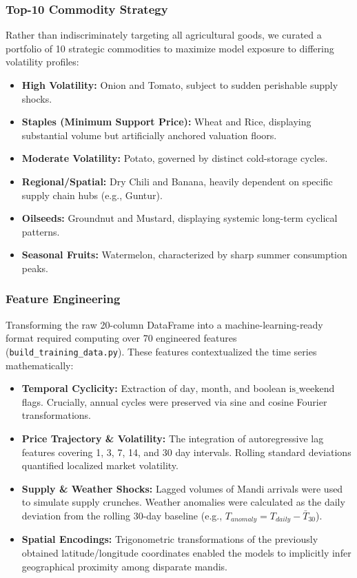 \documentclass[conference]{IEEEtran}
\begin{document}
\subsubsection{Top-10 Commodity Strategy}
Rather than indiscriminately targeting all agricultural goods, we curated a portfolio of 10 strategic commodities to maximize model exposure to differing volatility profiles:
\begin{itemize}
    \item \textbf{High Volatility:} Onion and Tomato, subject to sudden perishable supply shocks.
    \item \textbf{Staples (Minimum Support Price):} Wheat and Rice, displaying substantial volume but artificially anchored valuation floors.
    \item \textbf{Moderate Volatility:} Potato, governed by distinct cold-storage cycles.
    \item \textbf{Regional/Spatial:} Dry Chili and Banana, heavily dependent on specific supply chain hubs (e.g., Guntur).
    \item \textbf{Oilseeds:} Groundnut and Mustard, displaying systemic long-term cyclical patterns.
    \item \textbf{Seasonal Fruits:} Watermelon, characterized by sharp summer consumption peaks.
\end{itemize}

\subsubsection{Feature Engineering}
Transforming the raw 20-column DataFrame into a machine-learning-ready format required computing over 70 engineered features (\texttt{build\_training\_data.py}). These features contextualized the time series mathematically:
\begin{itemize}
    \item \textbf{Temporal Cyclicity:} Extraction of $\text{day}$, $\text{month}$, and boolean $\text{is\_weekend}$ flags. Crucially, annual cycles were preserved via sine and cosine Fourier transformations.
    \item \textbf{Price Trajectory \& Volatility:} The integration of autoregressive lag features covering 1, 3, 7, 14, and 30 day intervals. Rolling standard deviations quantified localized market volatility.
    \item \textbf{Supply \& Weather Shocks:} Lagged volumes of Mandi arrivals were used to simulate supply crunches. Weather anomalies were calculated as the daily deviation from the rolling 30-day baseline (e.g., $T_{anomaly} = T_{daily} - \bar{T}_{30}$).
    \item \textbf{Spatial Encodings:} Trigonometric transformations of the previously obtained latitude/longitude coordinates enabled the models to implicitly infer geographical proximity among disparate mandis.
\end{itemize}
\end{document}
